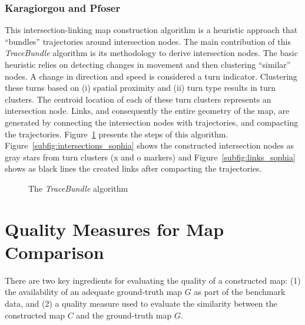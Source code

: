 \documentclass[natbib]{svjour3}                    \smartqed  \usepackage[table]{xcolor}
\begin{document}
\subsubsection{Karagiorgou and Pfoser \protect\cite{Karagiorgou:2012:VTD:2424321.2424334}}
\label{subsub:subsub_kp}
This intersection-linking map construction algorithm is a heuristic approach that ``bundles'' trajectories around intersection nodes. The main contribution of this \emph{TraceBundle} algorithm is its methodology to derive intersection nodes. The basic heuristic relies on detecting changes in movement and then clustering ``similar'' nodes. A change in direction and speed is considered a turn indicator. Clustering these turns based on (i) spatial proximity and (ii) turn type results in turn clusters. The centroid location of each of these turn clusters represents an intersection node. Links, and consequently the entire geometry of the map, are generated by connecting the intersection nodes with trajectories, and compacting the trajectories. Figure~\ref{fig:tracebundle} presents the steps of this algorithm. Figure~\ref{subfig:intersections_sophia} shows the constructed intersection nodes as gray stars from turn clusters (x and o markers) and Figure~\ref{subfig:links_sophia} shows as black lines the created links after compacting the  trajectories. 


\begin{figure}[htbp]
 \begin{center}
 \end{center}
\caption{The \emph{TraceBundle} algorithm \cite{Karagiorgou:2012:VTD:2424321.2424334}}
\label{fig:tracebundle}
\end{figure} 





\section{Quality Measures for Map Comparison}
\label{sec:sec_qmes}

There are two key ingredients for evaluating the quality of a constructed map: (1) the availability of an adequate ground-truth map $G$ as part of the benchmark data, and (2) a quality measure used to evaluate the similarity between the constructed map $C$ and the ground-truth map $G$.
\end{document}
